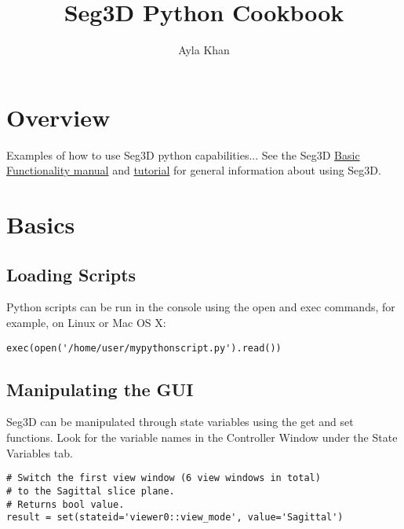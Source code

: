 \documentclass[fleqn,11pt,openany]{book}
\title{Seg3D Python Cookbook}
\author{Ayla Khan}
\begin{document}
\maketitle


\chapter{Overview}
\label{sec:overview}

\begin{introduction}
Examples of how to use Seg3D python capabilities...
See the Seg3D \href{http://www.sci.utah.edu/devbuilds/seg3d_docs/Seg3DBasicFunctionality.pdf}{Basic Functionality manual} and \href{http://www.sci.utah.edu/devbuilds/seg3d_docs/Seg3DTutorial.pdf}{tutorial} for general information about using Seg3D.
\end{introduction}

\chapter{Basics}

\section{Loading Scripts}
Python scripts can be run in the console using the open and exec commands, for example, on Linux or Mac OS X:

\begin{lstlisting}[label=samplecode,caption=A sample]
exec(open('/home/user/mypythonscript.py').read())
\end{lstlisting}

%

\section{Manipulating the GUI}

Seg3D can be manipulated through state variables using the get and set functions. Look for the variable names in the Controller Window under the State Variables tab.

\begin{lstlisting}[frame=single]
# Switch the first view window (6 view windows in total)
# to the Sagittal slice plane.
# Returns bool value.
result = set(stateid='viewer0::view_mode', value='Sagittal')
\end{lstlisting}
\end{document}
